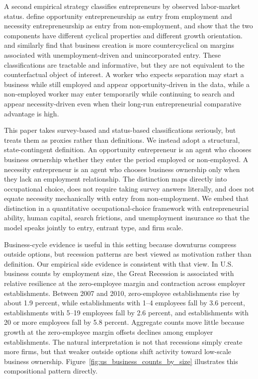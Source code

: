 A second empirical strategy classifies entrepreneurs by observed labor-market
status. \citet{fairlie_fossen_2019} define opportunity entrepreneurship as
entry from employment and necessity entrepreneurship as entry from
non-employment, and show that the two components have different cyclical
properties and different growth orientation. \citet{fairlie_2013} and
\citet{fossen_2021} similarly find that business creation is more
countercyclical on margins associated with unemployment-driven and
unincorporated entry. These classifications are tractable and informative, but
they are not equivalent to the counterfactual object of interest. A worker who
expects separation may start a business while still employed and appear
opportunity-driven in the data, while a non-employed worker may enter
temporarily while continuing to search and appear necessity-driven even when
their long-run entrepreneurial comparative advantage is high.

This paper takes survey-based and status-based classifications seriously, but
treats them as proxies rather than definitions. We instead adopt a structural,
state-contingent definition. An opportunity entrepreneur is an agent who
chooses business ownership whether they enter the period employed or
non-employed. A necessity entrepreneur is an agent who chooses business
ownership only when they lack an employment relationship. The distinction maps
directly into occupational choice, does not require taking survey answers
literally, and does not equate necessity mechanically with entry from
non-employment. We embed that distinction in a quantitative occupational-choice
framework with entrepreneurial ability, human capital, search frictions, and
unemployment insurance so that the model speaks jointly to entry, entrant type,
and firm scale.

Business-cycle evidence is useful in this setting because downturns compress
outside options, but recession patterns are best viewed as motivation rather
than definition. Our empirical side evidence is consistent with that view. In
U.S. business counts by employment size, the Great Recession is associated with
relative resilience at the zero-employee margin and contraction across employer
establishments. Between 2007 and 2010, zero-employee establishments rise by
about 1.9 percent, while establishments with 1--4 employees fall by 3.6
percent, establishments with 5--19 employees fall by 2.6 percent, and
establishments with 20 or more employees fall by 5.8 percent. Aggregate counts
move little because growth at the zero-employee margin offsets declines among
employer establishments. The natural interpretation is not that recessions
simply create more firms, but that weaker outside options shift activity toward
low-scale business ownership. Figure~\ref{fig:us_business_counts_by_size}
illustrates this compositional pattern directly.

